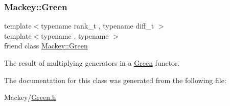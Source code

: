 \subsubsection{\texorpdfstring{Mackey\+::\+Green}{Mackey::Green}}
{\footnotesize\ttfamily template$<$typename rank\+\_\+t , typename diff\+\_\+t $>$ \\
template$<$typename , typename $>$ \\
friend class \hyperlink{classMackey_1_1Green}{Mackey\+::\+Green}\hspace{0.3cm}{\ttfamily [friend]}}



The result of multiplying generators in a \hyperlink{classMackey_1_1Green}{Green} functor. 



The documentation for this class was generated from the following file\+:\begin{DoxyCompactItemize}
\item 
Mackey/\hyperlink{Green_8h}{Green.\+h}\end{DoxyCompactItemize}
